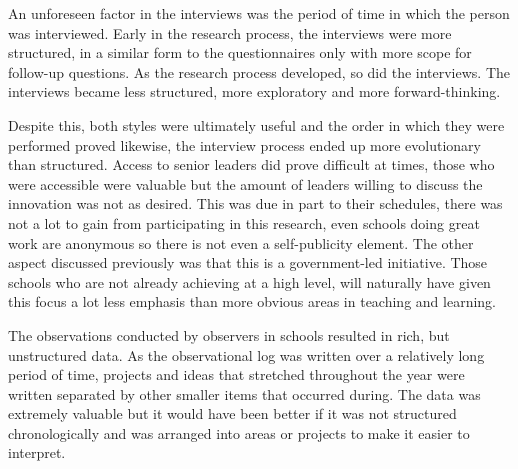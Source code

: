 An unforeseen factor in the interviews was the period of time in which the person was interviewed. Early in the research process, the interviews were more structured, in a similar form to the questionnaires only with more scope for follow-up questions. As the research process developed, so did the interviews. The interviews became less structured, more exploratory and more forward-thinking.

Despite this, both styles were ultimately useful and the order in which they were performed proved likewise, the interview process ended up more evolutionary than structured. Access to senior leaders did prove difficult at times, those who were accessible were valuable but the amount of leaders willing to discuss the innovation was not as desired. This was due in part to their schedules, there was not a lot to gain from participating in this research, even schools doing great work are anonymous so there is not even a self-publicity element. The other aspect discussed previously was that this is a government-led initiative. Those schools who are not already achieving at a high level, will naturally have given this focus a lot less emphasis than more obvious areas in teaching and learning. 

The observations conducted by observers in schools resulted in rich, but unstructured data. As the observational log was written over a relatively long period of time, projects and ideas that stretched throughout the year were written separated by other smaller items that occurred during. The data was extremely valuable but it would have been better if it was not structured chronologically and was arranged into areas or projects to make it easier to interpret.


